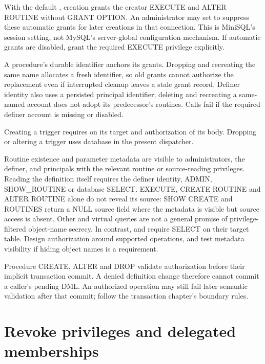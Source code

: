 With the default , creation grants the
creator EXECUTE and ALTER ROUTINE without GRANT OPTION. An administrator may
set  to suppress these automatic
grants for later creations in that connection. This is MiniSQL's session
setting, not MySQL's server-global configuration mechanism. If automatic
grants are disabled, grant the required EXECUTE privilege explicitly.

A procedure's durable identifier anchors its grants. Dropping and recreating
the same name allocates a fresh identifier, so old grants cannot authorize the
replacement even if interrupted cleanup leaves a stale grant record. Definer
identity also uses a persisted principal identifier; deleting and recreating
a same-named account does not adopt its predecessor's routines. Calls fail if
the required definer account is missing or disabled.

Creating a trigger requires 
on its target and authorization of its body. Dropping or altering a trigger
uses database  in the present dispatcher.

Routine existence and parameter metadata are visible to administrators,
the definer, and principals with the relevant routine or source-reading
privileges. Reading the definition itself requires the definer identity,
ADMIN, SHOW\_ROUTINE or database SELECT. EXECUTE, CREATE ROUTINE and ALTER
ROUTINE alone do not reveal its source: SHOW CREATE and ROUTINES return a
NULL source field where the metadata is visible but source access is absent.
Other
 and virtual  queries are not
a general promise of privilege-filtered object-name secrecy. In contrast,
 and  require SELECT on their target
table. Design authorization around supported operations, and test metadata
visibility if hiding object names is a requirement.

Procedure CREATE, ALTER and DROP validate authorization before their implicit
transaction commit. A denied definition change therefore cannot commit a
caller's pending DML. An authorized operation may still fail later semantic
validation after that commit; follow the transaction chapter's boundary rules.


\section{Revoke privileges and delegated memberships}

